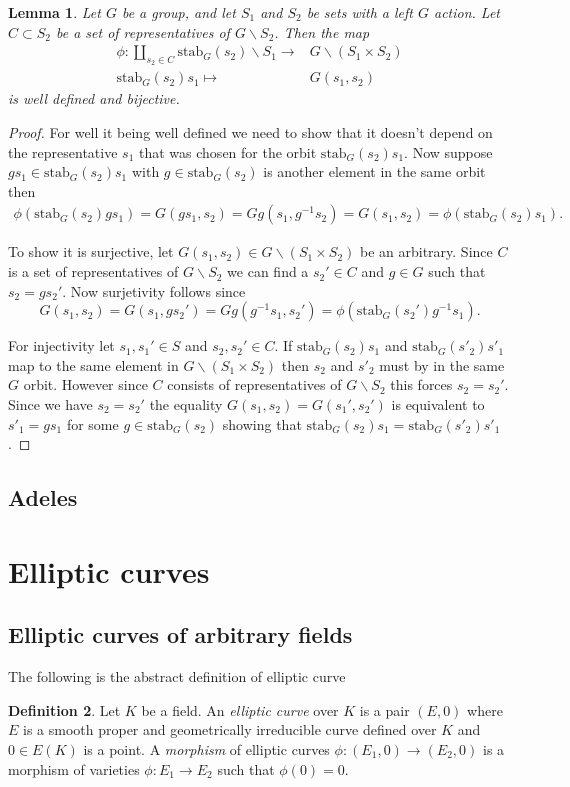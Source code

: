 \documentclass[a4paper,12pt,reqno]{amsart}
\newcommand{\stab}[2]{\text{stab}_{#1}(#2)}
\newtheorem{lemma}{Lemma}
\theoremstyle{definition}
\newtheorem{definition}[lemma]{Definition}
\numberwithin{lemma}{section}
\numberwithin{equation}{section}
\numberwithin{figure}{section}
\begin{document}
\begin{lemma}
	Let $G$ be a group, and let $S_1$ and $S_2$ be sets with a left $G$ action. Let $C \subset S_2$ be a set of representatives of $G\backslash S_2$.
	Then the map \begin{align*}
	\phi : \coprod_{s_2 \in C} \stab{G}{s_2}\backslash S_1 \to& G \backslash(S_1 \times S_2)\\
	 \stab{G}{s_2}s_1\mapsto& G(s_1,s_2)
	\end{align*}
	is well defined and bijective.
\end{lemma}
\begin{proof}
For well it being well defined we need to show that it doesn't depend on the representative $s_1$ that was chosen for the orbit $\stab{G}{s_2}s_1$. Now suppose $gs_1 \in \stab{G}{s_2}s_1$ with $g \in \stab{G}{s_2}$ is another element in the same orbit then \begin{align*}\phi(\stab{G}{s_2}gs_1) = G(gs_1,s_2)=Gg(s_1,g^{-1}s_2)=G(s_1,s_2)=\phi(\stab{G}{s_2}s_1). \end{align*}

To show it is surjective, let $G(s_1,s_2) \in G\backslash(S_1 \times S_2)$ be an arbitrary. Since $C$ is a set of representatives of $G\backslash S_2$ we can find a $s_2' \in C$ and $g \in G$ such that $s_2=gs_2'$. Now surjetivity follows since $$G(s_1,s_2)=G(s_1,gs_2')=Gg(g^{-1}s_1,s_2') =  \phi(\stab{G}{s_2'}g^{-1}s_1).$$

For injectivity let $s_1, s_1' \in S$ and $s_2, s_2' \in C$. If  $\stab{G}{s_2}s_1$ and $\stab{G}{s'_2}s'_1$ map to the same element in $G\backslash(S_1 \times S_2)$ then $s_2$ and $s'_2$ must by in the same $G$ orbit. However since $C$ consists of representatives of $G \backslash S_2$ this forces $s_2 = s_2'$. Since we have $s_2=s_2'$ the equality $G(s_1,s_2) = G(s_1',s_2')$ is equivalent to $s'_1=gs_1$ for some $g \in \stab{G}{s_2}$ showing that $\stab{G}{s_2}s_1=\stab{G}{s'_2}s'_1$.
\end{proof}

\subsection{Adeles}

\section{Elliptic curves}

\subsection{Elliptic curves of arbitrary fields}
The following is the abstract definition of elliptic curve
\begin{definition}\label{def:ec-over-K}
Let $K$ be a field. An \textit{elliptic curve} over $K$ is a pair $(E,0)$ where $E$ is a smooth proper and geometrically irreducible curve defined over $K$ and $0 \in E(K)$ is a point. A \textit{morphism} of elliptic curves $\phi:  (E_1,0) \to (E_2,0)$ is a morphism of varieties $\phi: E_1 \to E_2$ such that $\phi(0)=0$.
\end{definition}
\end{document}
